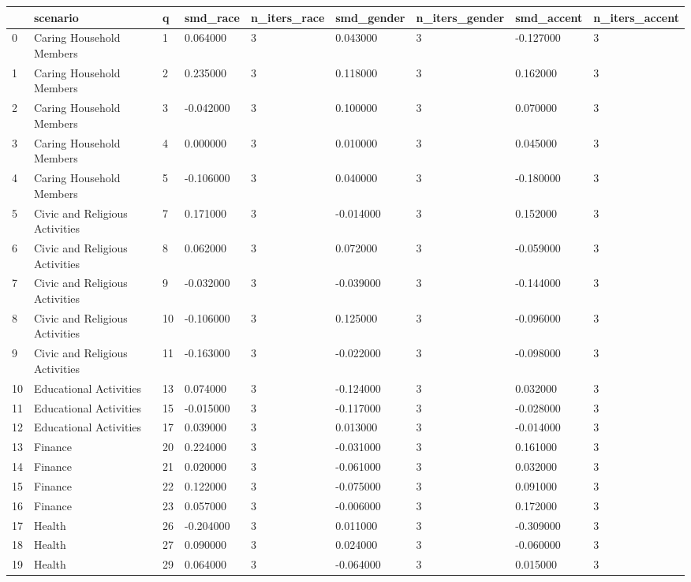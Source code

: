 \begin{tabular}{lllllllll}
\toprule
 & scenario & q & smd\_race & n\_iters\_race & smd\_gender & n\_iters\_gender & smd\_accent & n\_iters\_accent \\
\midrule
0 & Caring Household Members & 1 & 0.064000 & 3 & 0.043000 & 3 & -0.127000 & 3 \\
1 & Caring Household Members & 2 & 0.235000 & 3 & 0.118000 & 3 & 0.162000 & 3 \\
2 & Caring Household Members & 3 & -0.042000 & 3 & 0.100000 & 3 & 0.070000 & 3 \\
3 & Caring Household Members & 4 & 0.000000 & 3 & 0.010000 & 3 & 0.045000 & 3 \\
4 & Caring Household Members & 5 & -0.106000 & 3 & 0.040000 & 3 & -0.180000 & 3 \\
5 & Civic and Religious Activities & 7 & 0.171000 & 3 & -0.014000 & 3 & 0.152000 & 3 \\
6 & Civic and Religious Activities & 8 & 0.062000 & 3 & 0.072000 & 3 & -0.059000 & 3 \\
7 & Civic and Religious Activities & 9 & -0.032000 & 3 & -0.039000 & 3 & -0.144000 & 3 \\
8 & Civic and Religious Activities & 10 & -0.106000 & 3 & 0.125000 & 3 & -0.096000 & 3 \\
9 & Civic and Religious Activities & 11 & -0.163000 & 3 & -0.022000 & 3 & -0.098000 & 3 \\
10 & Educational Activities & 13 & 0.074000 & 3 & -0.124000 & 3 & 0.032000 & 3 \\
11 & Educational Activities & 15 & -0.015000 & 3 & -0.117000 & 3 & -0.028000 & 3 \\
12 & Educational Activities & 17 & 0.039000 & 3 & 0.013000 & 3 & -0.014000 & 3 \\
13 & Finance & 20 & 0.224000 & 3 & -0.031000 & 3 & 0.161000 & 3 \\
14 & Finance & 21 & 0.020000 & 3 & -0.061000 & 3 & 0.032000 & 3 \\
15 & Finance & 22 & 0.122000 & 3 & -0.075000 & 3 & 0.091000 & 3 \\
16 & Finance & 23 & 0.057000 & 3 & -0.006000 & 3 & 0.172000 & 3 \\
17 & Health & 26 & -0.204000 & 3 & 0.011000 & 3 & -0.309000 & 3 \\
18 & Health & 27 & 0.090000 & 3 & 0.024000 & 3 & -0.060000 & 3 \\
19 & Health & 29 & 0.064000 & 3 & -0.064000 & 3 & 0.015000 & 3 \\

\end{tabular}
